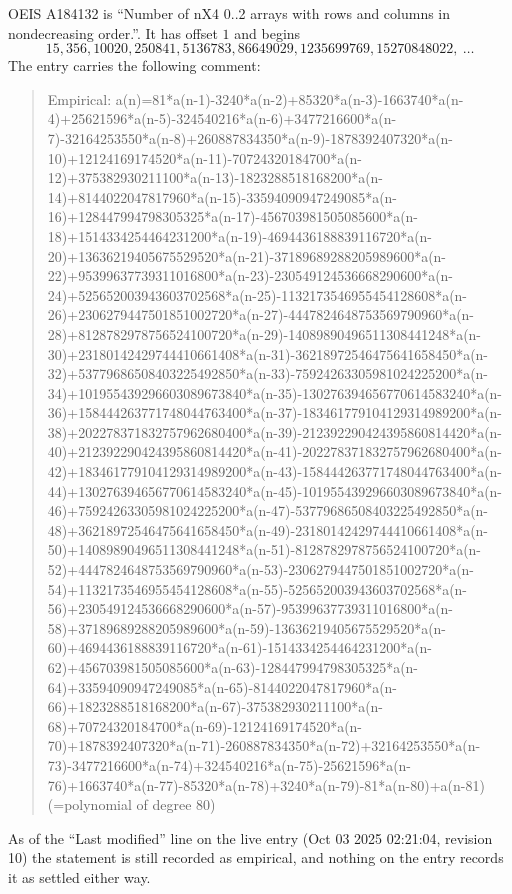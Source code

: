 \documentclass[11pt,a4paper]{article}
\theoremstyle{plain}
\theoremstyle{definition}
\begin{document}
OEIS A184132 is ``Number of nX4 0..2 arrays with rows and columns in nondecreasing order.''. It has offset $1$ and begins
\[
15, 356, 10020, 250841, 5136783, 86649029, 1235699769, 15270848022,\ \dots
\]
The entry carries the following comment:
\begin{quote}\small
Empirical: a(n)=81*a(n-1)-3240*a(n-2)+85320*a(n-3)-1663740*a(n-4)+25621596*a(n-5)-324540216*a(n-6)+3477216600*a(n-7)-32164253550*a(n-8)+260887834350*a(n-9)-1878392407320*a(n-10)+12124169174520*a(n-11)-70724320184700*a(n-12)+375382930211100*a(n-13)-1823288518168200*a(n-14)+8144022047817960*a(n-15)-33594090947249085*a(n-16)+128447994798305325*a(n-17)-456703981505085600*a(n-18)+1514334254464231200*a(n-19)-4694436188839116720*a(n-20)+13636219405675529520*a(n-21)-37189689288205989600*a(n-22)+95399637739311016800*a(n-23)-230549124536668290600*a(n-24)+525652003943603702568*a(n-25)-1132173546955454128608*a(n-26)+2306279447501851002720*a(n-27)-4447824648753569790960*a(n-28)+8128782978756524100720*a(n-29)-14089890496511308441248*a(n-30)+23180142429744410661408*a(n-31)-36218972546475641658450*a(n-32)+53779686508403225492850*a(n-33)-75924263305981024225200*a(n-34)+101955439296603089673840*a(n-35)-130276394656770614583240*a(n-36)+158444263771748044763400*a(n-37)-183461779104129314989200*a(n-38)+202278371832757962680400*a(n-39)-212392290424395860814420*a(n-40)+212392290424395860814420*a(n-41)-202278371832757962680400*a(n-42)+183461779104129314989200*a(n-43)-158444263771748044763400*a(n-44)+130276394656770614583240*a(n-45)-101955439296603089673840*a(n-46)+75924263305981024225200*a(n-47)-53779686508403225492850*a(n-48)+36218972546475641658450*a(n-49)-23180142429744410661408*a(n-50)+14089890496511308441248*a(n-51)-8128782978756524100720*a(n-52)+4447824648753569790960*a(n-53)-2306279447501851002720*a(n-54)+1132173546955454128608*a(n-55)-525652003943603702568*a(n-56)+230549124536668290600*a(n-57)-95399637739311016800*a(n-58)+37189689288205989600*a(n-59)-13636219405675529520*a(n-60)+4694436188839116720*a(n-61)-1514334254464231200*a(n-62)+456703981505085600*a(n-63)-128447994798305325*a(n-64)+33594090947249085*a(n-65)-8144022047817960*a(n-66)+1823288518168200*a(n-67)-375382930211100*a(n-68)+70724320184700*a(n-69)-12124169174520*a(n-70)+1878392407320*a(n-71)-260887834350*a(n-72)+32164253550*a(n-73)-3477216600*a(n-74)+324540216*a(n-75)-25621596*a(n-76)+1663740*a(n-77)-85320*a(n-78)+3240*a(n-79)-81*a(n-80)+a(n-81) (=polynomial of degree 80)
\end{quote}
As of the ``Last modified'' line on the live entry (Oct 03 2025 02:21:04, revision 10) the statement is
still recorded as empirical, and nothing on the entry records it as settled either way.
\end{document}
